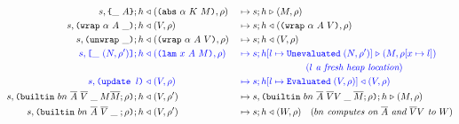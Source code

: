 \begin{figure}
\begin{subfigure}[c]{\linewidth}
{\begin{alignat*}{2}
      s,\texttt{\{}\_ ~ A\texttt{\}};h &\mathrel\triangleleft (\texttt{(} \texttt{abs} ~ \alpha ~ K ~ M \texttt{)},\rho) 
                                                    &{}\mapsto{}& s;h \mathrel\triangleright (M,\rho) \\
      s,\texttt{(} \texttt{wrap} ~ \alpha ~ A ~ \_ \texttt{)};h &\mathrel\triangleleft (V, \rho) &{}\mapsto{}& s;h \mathrel\triangleleft (\texttt{(} \texttt{wrap} ~ \alpha ~ A ~ V \texttt{)}, \rho)\\
      s,\texttt{(} \texttt{unwrap} ~ \_ \texttt{)}{};h &\mathrel\triangleleft (\texttt{(} \texttt{wrap} ~ \alpha ~ A ~ V \texttt{)}, \rho) 
                                                    &{}\mapsto{}& s;h \mathrel\triangleleft (V,\rho)\\
      \textcolor{blue}{s,\texttt{[} \_ ~ (N,\rho^{\prime}) \texttt{]};h} & \color{blue}\mathrel\triangleleft (\texttt{(} \texttt{lam} ~ x ~ A ~ M \texttt{)}, \rho) 
                                                    &{}\color{blue}\mapsto{}& \textcolor{blue}{s;h[l\mapsto \texttt{Unevaluated}\;(N,\rho^{\prime})] \mathrel\triangleright (M, \rho[x \mapsto l])}\\
      & & & \hspace{2cm}\textcolor{blue}{(\textit{$l$ a fresh heap location})}\\
      \textcolor{blue}{s, \texttt{(update\ $l$)}}  & \color{blue}\mathrel\triangleleft (V, \rho)   &{}\color{blue}\mapsto{}& \textcolor{blue}{s;h[l\mapsto \texttt{Evaluated}\;(V, \rho)] \mathrel\triangleleft (V,\rho)}\\
      s, \texttt{(} \texttt{builtin} ~ bn ~ \overline{A} ~ \overline{V}\; \_\; M \overline{M}; \rho \texttt{)}{}; h &\mathrel\triangleleft (V , \rho^{\prime})
                                                    &{}\mapsto{}& s, \texttt{(} \texttt{builtin} ~ bn ~ \overline{A} ~ \overline{V} V\; \_\; \overline{M}; \rho \texttt{)};h \mathrel\triangleright (M, \rho)\\
      s,\texttt{(} \texttt{builtin} ~ bn ~ \overline{A} ~ \overline{V}\; \_\; ; \rho \texttt{)}; h &\mathrel\triangleleft (V, \rho^{\prime}) 
                                                    &{}\mapsto{}& s;h \mathrel\triangleleft (W, \rho) \quad 
                                                    (\textit{$bn$ computes on $\overline{A}$ and $\overline{V}V$ to $W$})\\
\end{alignat*}
}
\end{subfigure}

\end{figure}



